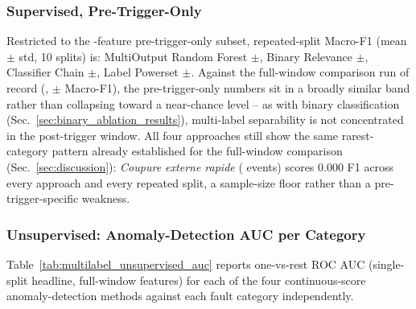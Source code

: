 \subsubsection{Supervised, Pre-Trigger-Only}

Restricted to the \MetricZeroSixbPhaseOneBinaryPretriggerNFeatures{}-feature pre-trigger-only subset, repeated-split Macro-F1 (mean $\pm$ std, 10 splits) is: MultiOutput Random Forest \MetricZeroSevenPhaseTwoMultilabelStabilityPretriggerStabilityMacroFOneMean$\pm$\MetricZeroSevenPhaseTwoMultilabelStabilityPretriggerStabilityMacroFOneStd, Binary Relevance \MetricZeroSevenAPhaseABrCcStabilityPretriggerStabilityMacroFOneMean$\pm$\MetricZeroSevenAPhaseABrCcStabilityPretriggerStabilityMacroFOneStd, Classifier Chain \MetricZeroEightPhaseBCcStabilityPretriggerStabilityMacroFOneMean$\pm$\MetricZeroEightPhaseBCcStabilityPretriggerStabilityMacroFOneStd, Label Powerset \MetricZeroNinePhaseCLpStabilityPretriggerStabilityMacroFOneMean$\pm$\MetricZeroNinePhaseCLpStabilityPretriggerStabilityMacroFOneStd. %
Against the full-window comparison run of record (\MetricZeroSevenMultilabelPhaseABCDBestApproach{}, \MetricZeroNinePhaseCLpStabilityMacroFOneMean$\pm$\MetricZeroNinePhaseCLpStabilityMacroFOneStd{} Macro-F1), the pre-trigger-only numbers sit in a broadly similar band rather than collapsing toward a near-chance level -- as with binary classification (Sec.~\ref{sec:binary_ablation_results}), multi-label separability is not concentrated in the post-trigger window. All four approaches still show the same rarest-category pattern already established for the full-window comparison (Sec.~\ref{sec:discussion}): \textit{Coupure externe rapide} (\MetricZeroZeroDataAttritionChainGtPassingCoupureExterneRapide{} events) scores 0.000 F1 across every approach and every repeated split, a sample-size floor rather than a pre-trigger-specific weakness. %

\subsubsection{Unsupervised: Anomaly-Detection AUC per Category}

Table~\ref{tab:multilabel_unsupervised_auc} reports one-vs-rest ROC AUC (single-split headline, full-window features) for each of the four continuous-score anomaly-detection methods against each fault category independently.

